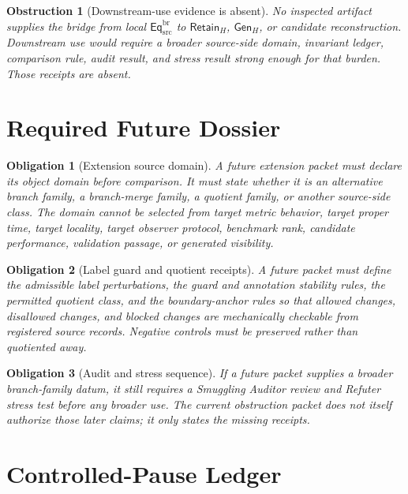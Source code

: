 \documentclass[11pt]{article}
\newcommand{\EqBr}{\mathsf{Eq}_{\mathrm{src}}^{\mathrm{br}}}
\newcommand{\RetainH}{\mathsf{Retain}_{H}}
\newcommand{\GenH}{\mathsf{Gen}_{H}}
\newtheorem{obstruction}{Obstruction}
\newtheorem{obligation}{Obligation}
\begin{document}
\begin{obstruction}[Downstream-use evidence is absent]
No inspected artifact supplies the bridge from local \(\EqBr\) to
\(\RetainH\), \(\GenH\), or candidate reconstruction. Downstream use
would require a broader source-side domain, invariant ledger, comparison
rule, audit result, and stress result strong enough for that burden.
Those receipts are absent.
\end{obstruction}

\section{Required Future Dossier}

\begin{obligation}[Extension source domain]
A future extension packet must declare its object domain before
comparison. It must state whether it is an alternative branch family, a
branch-merge family, a quotient family, or another source-side class. The
domain cannot be selected from target metric behavior, target proper
time, target locality, target observer protocol, benchmark rank,
candidate performance, validation passage, or generated visibility.
\end{obligation}

\begin{obligation}[Label guard and quotient receipts]
A future packet must define the admissible label perturbations, the guard
and annotation stability rules, the permitted quotient class, and the
boundary-anchor rules so that allowed changes, disallowed changes, and
blocked changes are mechanically checkable from registered source
records. Negative controls must be preserved rather than quotiented away.
\end{obligation}

\begin{obligation}[Audit and stress sequence]
If a future packet supplies a broader branch-family datum, it still
requires a Smuggling Auditor review and Refuter stress test before any
broader use. The current obstruction packet does not itself authorize
those later claims; it only states the missing receipts.
\end{obligation}

\section{Controlled-Pause Ledger}
\end{document}
